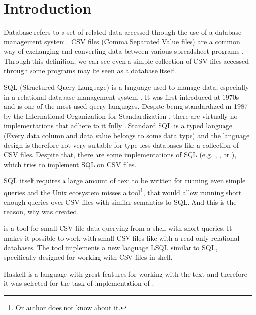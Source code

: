 \chapter*{Introduction}

Database refers to a set of related data accessed through the use of a database management system \cite{enwiki-database}.
CSV files (Comma Separated Value files) are a common way of exchanging and converting data between various spreadsheet programs \cite{rfc4180}.
Through this definition, we can see even a simple collection of CSV files accessed through some programs may be seen as a database itself.


SQL (Structured Query Language) is a language used to manage data, especially in a relational database management system \cite{enwiki-sql}.
It was first introduced at 1970s \cite{enwiki-sql} and is one of the most used query languages. 
Despite being standardized in 1987 by the International Organization for Standardization \cite{ISO9075-1987}, 
there are virtually no implementations that adhere to it fully \cite{enwiki-sql}.
Standard SQL is a typed language (Every data column and data value belongs to some data type) \cite{ISO9075-2023} and the language
design is therefore not very suitable for type-less databases like a collection of CSV files.
Despite that, there are some implementations of SQL (e.g.  \cite{q},  \cite{csv-sql},  \cite{trdsql} or  \cite{csvq}), which tries to implement SQL on CSV files.

SQL itself requires a large amount of text to be written for running even simple queries and the Unix ecosystem misses a tool\footnote{Or author does not know about it.}, 
that would allow running short enough queries over CSV files with similar semantics to SQL. And this is the reason, why  was created.

 is a tool for small CSV file data querying from a shell with short queries. It makes it possible to work with small CSV files like with a read-only relational databases.
The tool implements a new language LSQL similar to SQL, specifically designed for working with CSV files in shell.

Haskell is a language with great features for working with the text \cite{practical-haskell} and therefore it was selected for the task of implementation of .
